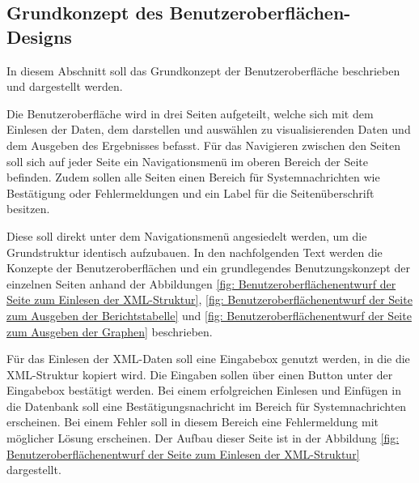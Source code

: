 \subsection{Grundkonzept des Benutzeroberflächen-Designs}
\label{subsec:grundkonzept-des-benutzeroberflachen-design}

In diesem Abschnitt soll das Grundkonzept der Benutzeroberfläche beschrieben und dargestellt werden.

Die Benutzeroberfläche wird in drei Seiten aufgeteilt, welche sich mit dem Einlesen der Daten, dem
darstellen und auswählen zu visualisierenden Daten und dem Ausgeben des Ergebnisses befasst.
Für das Navigieren zwischen den Seiten soll sich auf jeder Seite ein Navigationsmenü im oberen Bereich
der Seite befinden. Zudem sollen alle Seiten einen Bereich für Systemnachrichten wie Bestätigung oder
Fehlermeldungen und ein Label für die Seitenüberschrift besitzen.

Diese soll direkt unter dem Navigationsmenü angesiedelt werden, um die Grundstruktur identisch aufzubauen. In den nachfolgenden Text werden
die Konzepte der Benutzeroberflächen und ein grundlegendes Benutzungskonzept der einzelnen Seiten
anhand der Abbildungen \ref{fig: Benutzeroberflächenentwurf der Seite zum Einlesen der XML-Struktur},
\ref{fig: Benutzeroberflächenentwurf der Seite zum Ausgeben der Berichtstabelle} und \ref{fig: Benutzeroberflächenentwurf der Seite zum Ausgeben der Graphen} beschrieben.

Für das Einlesen der XML-Daten soll eine Eingabebox genutzt werden, in die die XML-Struktur kopiert wird.
Die Eingaben sollen über einen Button unter der Eingabebox bestätigt werden. Bei einem erfolgreichen
Einlesen und Einfügen in die Datenbank soll eine Bestätigungsnachricht im Bereich für
Systemnachrichten erscheinen. Bei einem Fehler soll in diesem Bereich eine Fehlermeldung mit
möglicher Lösung erscheinen. Der Aufbau dieser Seite ist in der Abbildung \ref{fig: Benutzeroberflächenentwurf der Seite zum Einlesen der XML-Struktur} dargestellt.

